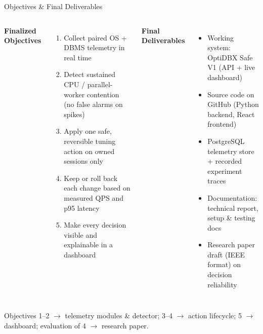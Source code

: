 \documentclass[aspectratio=169,11pt]{beamer}
\newcommand{\smallnote}[1]{%
\vspace{0.08cm}
{\scriptsize\color{GEUGrey}#1}
}
\begin{document}
\begin{frame}{Objectives \& Final Deliverables}

\begin{columns}[T,totalwidth=\textwidth]


\textbf{\color{GEUBlue}Finalized Objectives}

\begin{enumerate}\itemsep3pt\small
    \item Collect paired OS + DBMS telemetry in real time
    \item Detect sustained CPU / parallel-worker contention (no false alarms on spikes)
    \item Apply one safe, reversible tuning action on owned sessions only
    \item Keep or roll back each change based on measured QPS and p95 latency
    \item Make every decision visible and explainable in a dashboard
\end{enumerate}


\textbf{\color{GEUBlue}Final Deliverables}

\begin{itemize}\itemsep3pt\small
    \item Working system: OptiDBX Safe V1 (API + live dashboard)
    \item Source code on GitHub (Python backend, React frontend)
    \item PostgreSQL telemetry store + recorded experiment traces
    \item Documentation: technical report, setup \& testing docs
    \item Research paper draft (IEEE format) on decision reliability
\end{itemize}

\end{columns}

\vfill

\smallnote{
Objectives 1--2 $\rightarrow$ telemetry modules \& detector; 3--4 $\rightarrow$
action lifecycle; 5 $\rightarrow$ dashboard; evaluation of 4 $\rightarrow$ research paper.
}

\end{frame}
\end{document}

